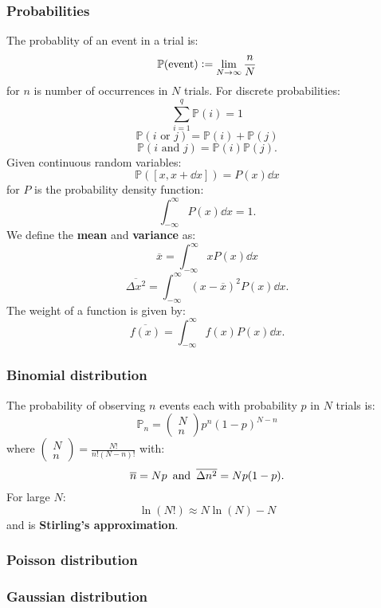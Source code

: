 \documentclass{article}
\newcommand{\deq}{\vcentcolon=}
\newcommand{\pr}{\mathbb{P}}
\begin{document}
\begin{multicols*}{3}
\noindent

\subsubsection*{Probabilities}
The probablity of an event in a trial is:
$$\pr(\text{event})\deq\lim_{N\rightarrow\infty}\frac{n}{N}$$
for $n$ is number of occurrences in $N$ trials.
For discrete probabilities:
$$\sum_{i=1}^{q}\pr(i)=1$$
$$\pr(\text{$i$ or $j$})=\pr(i)+\pr(j)$$
$$\pr(\text{$i$ and $j$})=\pr(i)\pr(j).$$
Given continuous random variables:
$$\pr([x,x+\dd x])=P(x)\dd x$$
for $P$ is the probability density function:
$$\int_{-\infty}^{\infty}P(x)\dd x=1.$$
We define the \textbf{mean} and \textbf{variance} as:
$$\overline{x}=\int_{-\infty}^{\infty}xP(x)\dd x$$
$$\overline{\Delta x^2}=\int_{-\infty}^{\infty}
(x-\overline{x})^2P(x)\dd x.$$
The weight of a function is given by:
$$\overline{f(x)}=\int_{-\infty}^{\infty}f(x)P(x)\dd x.$$

\subsubsection*{Binomial distribution}
The probability of observing $n$ events 
each with probability $p$ in $N$ trials is:
$$\pr_n=\begin{pmatrix}
N \\ n\end{pmatrix}p^n(1-p)^{N-n}$$
where
$\displaystyle\begin{pmatrix}N \\ n\end{pmatrix}
=\frac{N!}{n!(N-n)!}$ with:
$$\overline{n}=Np
\hspace{0.07in}\text{and}\hspace{0.07in}
\overline{\Delta n^2}=Np(1-p).$$
For large $N$:
$$\ln(N!)\approx N\ln(N)-N$$
and is \textbf{Stirling's approximation}.

\subsubsection*{Poisson distribution}

\subsubsection*{Gaussian distribution}


\end{multicols*}
\end{document}

